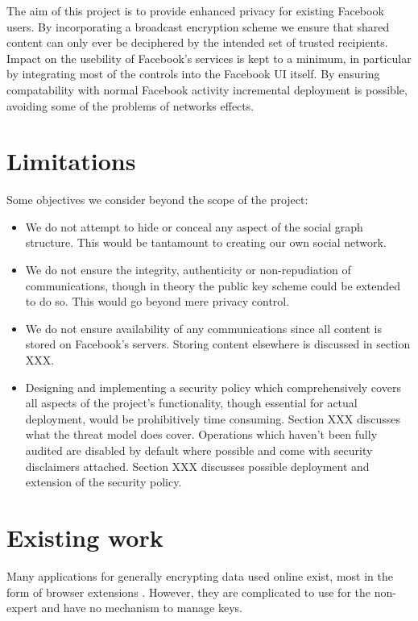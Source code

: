 The aim of this project is to provide enhanced privacy for existing Facebook users. By incorporating a broadcast encryption scheme we ensure that shared content can only ever be deciphered by the intended set of trusted recipients. Impact on the usebility of Facebook's services is kept to a minimum, in particular by integrating most of the controls into the Facebook UI itself. By ensuring compatability with normal Facebook activity incremental deployment is possible, avoiding some of the problems of networks effects.

\section{Limitations}

Some objectives we consider beyond the scope of the project:

\begin{itemize}
    \item We do not attempt to hide or conceal any aspect of the social graph structure. This would be tantamount to creating our own social network.
    
    \item We do not ensure the integrity, authenticity or non-repudiation of communications, though in theory the public key scheme could be extended to do so. This would go beyond mere privacy control.
    
    \item We do not ensure availability of any communications since all content is stored on Facebook's servers. Storing content elsewhere is discussed in section XXX.
    
    \item Designing and implementing a security policy which comprehensively covers all aspects of the project's functionality, though essential for actual deployment, would be prohibitively time consuming. Section XXX discusses what the threat model does cover. Operations which haven't been fully audited are disabled by default where possible and come with security disclaimers attached. Section XXX discusses possible deployment and extension of the security policy.
    
\end{itemize}


\section{Existing work}


    Many applications for generally encrypting data used online exist, most in the form of browser extensions \cite{firegpg} \cite{cryptfire} \cite{textcrypt}. However, they are complicated to use for the non-expert \cite{pgp-hard} and have no mechanism to manage keys.
    
